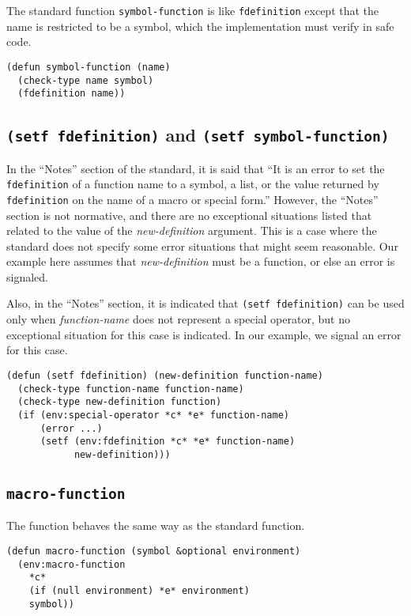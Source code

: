 The standard function \texttt{symbol-function} is like
\texttt{fdefinition} except that the name is restricted to be a
symbol, which the implementation must verify in safe code.

\begin{verbatim}
(defun symbol-function (name)
  (check-type name symbol)
  (fdefinition name))
\end{verbatim}

\subsection{\texttt{(setf fdefinition)} and \texttt{(setf symbol-function)}}

In the ``Notes'' section of the \commonlisp{} standard, it is said
that ``It is an error to set the \texttt{fdefinition} of a function
name to a symbol, a list, or the value returned by
\texttt{fdefinition} on the name of a macro or special form.''
However, the ``Notes'' section is not normative, and there are no
exceptional situations listed that related to the value of the
\textit{new-definition} argument.  This is a case where the standard
does not specify some error situations that might seem reasonable.
Our example here assumes that \textit{new-definition} must be a
function, or else an error is signaled.

Also, in the ``Notes'' section, it is indicated that \texttt{(setf
  fdefinition)} can be used only when \textit{function-name} does not
represent a special operator, but no exceptional situation for this
case is indicated.  In our example, we signal an error for this case.

\begin{verbatim}
(defun (setf fdefinition) (new-definition function-name)
  (check-type function-name function-name)
  (check-type new-definition function)
  (if (env:special-operator *c* *e* function-name)
      (error ...)
      (setf (env:fdefinition *c* *e* function-name)
            new-definition)))
\end{verbatim}

\subsection{\texttt{macro-function}}

The \sysname{} function behaves the same way as the standard function.

\begin{verbatim}
(defun macro-function (symbol &optional environment)
  (env:macro-function
    *c*
    (if (null environment) *e* environment)
    symbol))
\end{verbatim}

